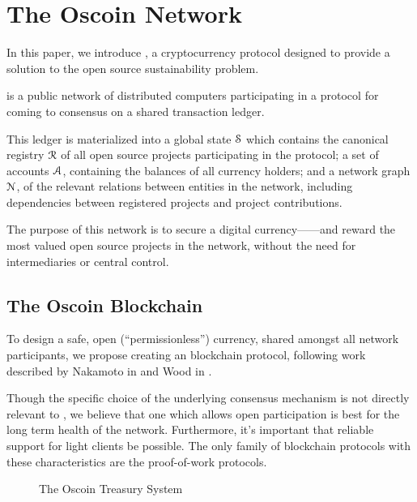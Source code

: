 \section{The Oscoin Network}
\label{s:oscoin}

\noindent In this paper, we introduce \oscoin{}, a cryptocurrency protocol
designed to provide a solution to the open source sustainability problem.

\oscoin{} is a public network of distributed computers participating in a
protocol for coming to consensus on a shared transaction ledger.

This ledger is materialized into a global state $\mathcal{S}$ which
contains the canonical registry $\mathcal{R}$ of all open source
projects participating in the \oscoin{} protocol; a set of accounts
$\mathcal{A}$, containing the balances of all currency holders; and
a network graph $\mathcal{N}$, of the relevant relations between
entities in the network, including dependencies between
registered projects and project contributions.

The purpose of this network is to secure a digital currency---\oscoin{}---and
reward the most valued open source projects in the network, without the need
for intermediaries or central control.

\subsection{The Oscoin Blockchain}

To design a safe, open (``permissionless'') currency, shared amongst all network
participants, we propose creating an \oscoin{} blockchain protocol, following
work described by Nakamoto in \cite{bitcoin} and Wood in \cite{ethereum}.

Though the specific choice of the underlying consensus mechanism is not
directly relevant to \oscoin{}, we believe that one which allows open
participation is best for the long term health of the network. Furthermore,
it's important that reliable support for light clients be possible. The only
family of blockchain protocols with these characteristics are the proof-of-work
protocols.


\begin{figure*}[!ht]
    \par\medskip\noindent\minipage{\linewidth}
    \centering
    
    \caption{The Oscoin Treasury System\label{f:treasury}}
    \endminipage\par\medskip
\end{figure*}

